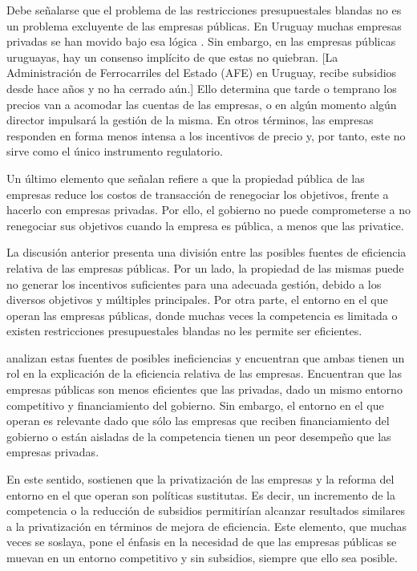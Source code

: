 \documentclass[
  12pt,
  spanish,
]{book}
\begin{document}
Debe señalarse que el problema de las restricciones presupuestales blandas no es un problema excluyente de las empresas públicas. En Uruguay muchas empresas privadas se han movido bajo esa lógica \citep{Vaz1993}. Sin embargo, en las empresas públicas uruguayas, hay un consenso implícito de que estas no quiebran.
{[}La Administración de Ferrocarriles del Estado (AFE) en Uruguay, recibe subsidios desde hace años y no ha cerrado aún.{]}
Ello determina que tarde o temprano los precios van a acomodar las cuentas de las empresas, o en algún momento algún director impulsará la gestión de la misma. En otros términos, las empresas responden en forma menos intensa a los incentivos de precio y, por tanto, este no sirve como el único instrumento regulatorio.

Un último elemento que señalan \citet{Sappington1987} refiere a que la propiedad pública de las empresas reduce los costos de transacción de renegociar los objetivos, frente a hacerlo con empresas privadas. Por ello, el gobierno no puede comprometerse a no renegociar sus objetivos cuando la empresa es pública, a menos que las privatice.

La discusión anterior presenta una división entre las posibles fuentes de eficiencia relativa de las empresas públicas. Por un lado, la propiedad de las mismas puede no generar los incentivos suficientes para una adecuada gestión, debido a los diversos objetivos y múltiples principales. Por otra parte, el entorno en el que operan las empresas públicas, donde muchas veces la competencia es limitada o existen restricciones presupuestales blandas no les permite ser eficientes.

\citet{Bartel2005} analizan estas fuentes de posibles ineficiencias y encuentran que ambas tienen un rol en la explicación de la eficiencia relativa de las empresas. Encuentran que las empresas públicas son menos eficientes que las privadas, dado un mismo entorno competitivo y financiamiento del gobierno. Sin embargo, el entorno en el que operan es relevante dado que sólo las empresas que reciben financiamiento del gobierno o están aisladas de la competencia tienen un peor desempeño que las empresas privadas.

En este sentido, sostienen que la privatización de las empresas y la reforma del entorno en el que operan son políticas sustitutas. Es decir, un incremento de la competencia o la reducción de subsidios permitirían alcanzar resultados similares a la privatización en términos de mejora de eficiencia. Este elemento, que muchas veces se soslaya, pone el énfasis en la necesidad de que las empresas públicas se muevan en un entorno competitivo y sin subsidios, siempre que ello sea posible.
\end{document}
